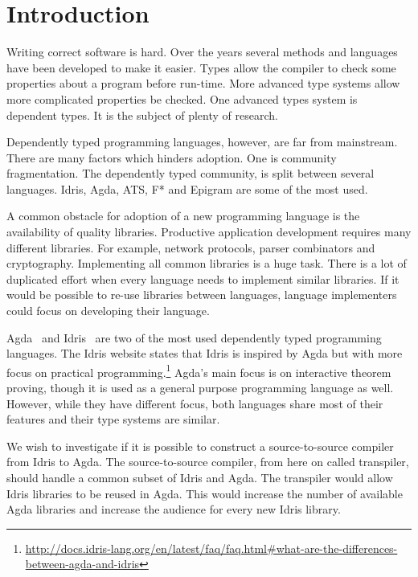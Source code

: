 \chapter{Introduction}

Writing correct software is hard. Over the years several methods and languages
have been developed to make it easier. Types allow the compiler to check some
properties about a program before run-time. More advanced type systems allow
more complicated properties be checked.
One advanced types system is dependent types. It is the subject of plenty
of research.

Dependently typed programming languages, however, are far from mainstream.
There are many factors which hinders adoption. One is community fragmentation.
The dependently typed community, is split between several languages.
Idris, Agda, ATS, F* and Epigram are some of the most used.

A common obstacle for adoption of a new programming language is the
availability of quality libraries. Productive application development requires
many different libraries.  For example, network protocols, parser combinators
and cryptography.  Implementing all common libraries is a huge task.  There is
a lot of duplicated effort when every language needs to implement similar
libraries.  If it would be possible to re-use libraries between languages,
language implementers could focus on developing their language.

Agda~\cite{agda} and Idris~\cite{idris} are two of the most used dependently
typed programming languages.
The Idris website states that Idris is inspired
by Agda but with more focus on practical
programming.\footnote{\url{http://docs.idris-lang.org/en/latest/faq/faq.html\#what-are-the-differences-between-agda-and-idris}}
Agda's main focus is on interactive theorem proving, though it is used as
a general purpose programming language as well.
However, while they have different focus, both languages share most of their features and their type systems are similar.

We wish to investigate if it is possible to construct a source-to-source
compiler from Idris to Agda. The source-to-source compiler, from here on called
transpiler, should handle a common subset of Idris and Agda.  The transpiler
would allow Idris libraries to be reused in Agda. This would increase the
number of available Agda libraries and increase the audience for every new
Idris library.


